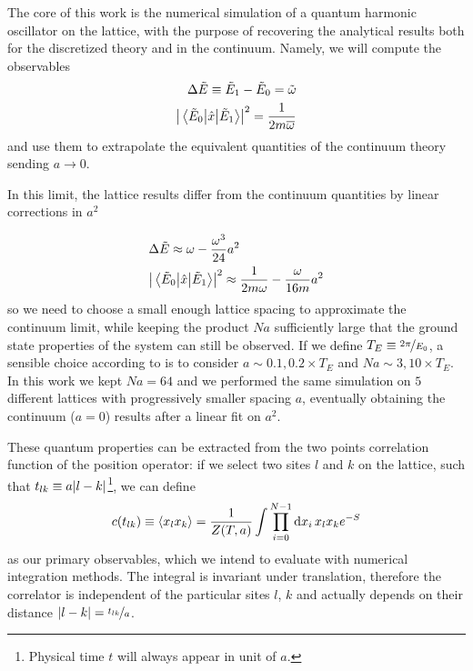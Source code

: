The core of this work is the  numerical simulation of a quantum
harmonic oscillator on the lattice, with the purpose of recovering the analytical results both for the discretized theory and in the continuum.
Namely, we will compute the observables
\begin{align}
  \label{eqn:phys1}
  \Delta \tilde{E} \equiv \tilde{E}_1-\tilde{E}_0=\tilde{\omega}\\
  \abs{\mel{\tilde{E}_0}{\hat{x}}{\tilde{E}_1}} ^2 = \frac{1}{2m\overline{\omega}} \label{eqn:phys2}
\end{align}
and use them to extrapolate the equivalent quantities of the continuum theory sending $a\to 0$.

In this limit, the lattice results differ from the continuum quantities by linear corrections in $a ^2$

\begin{align}
  &\Delta \tilde{E} \approx \omega - \frac{\omega ^{3}}{24}a ^2 \label{eqn:fullen}\\
  &\abs{\mel{\tilde{E}_0}{\hat{x}}{\tilde{E}_1}} ^2 \approx \frac{1}{2m\omega} - \frac{\omega}{16m}a ^2 \label{eqn:fullmat}
\end{align}
so we need to choose a small enough lattice spacing to approximate the continuum limit, while keeping
the product $Na$ sufficiently large that the ground state properties of the system can still be observed.
If we define $T_{E}\equiv \nicefrac{2\pi}{E_{0}}$, a sensible choice according to \cite{Creutz1981ASA} is to consider $a\sim 0.1,0.2 \times T_{E}$ and $Na \sim 3,10 \times T_{E}$. In this work we kept $Na=64$ and we performed the same simulation on $5$ different lattices with progressively smaller spacing $a$, eventually obtaining the continuum ($a=0$) results after a linear fit on $a ^2$.

These quantum properties can be extracted from the two points correlation function of the position operator:
if we select two sites $l$ and $k$ on the lattice, such that $t_{lk} \equiv a\abs{l-k}$\footnote{Physical time $t$ will always appear in unit of $a$.},
we can define
\begin{align}
\label{eqn:integral}
\ct \equiv  \ev{x_{l}x_{k}} = \frac{1}{Z(T,a)}\int \prod_{i=0}^{N-1}\dd{x}_{i}x_{l}x_{k}e ^{-S}
\end{align}
as our primary observables, which we intend to evaluate with numerical integration methods.
The integral is invariant under translation, therefore the correlator is independent of the
particular sites $l$, $k$ and actually depends on their distance $\abs{l-k} = \nicefrac{t_{lk}}{a}$.

